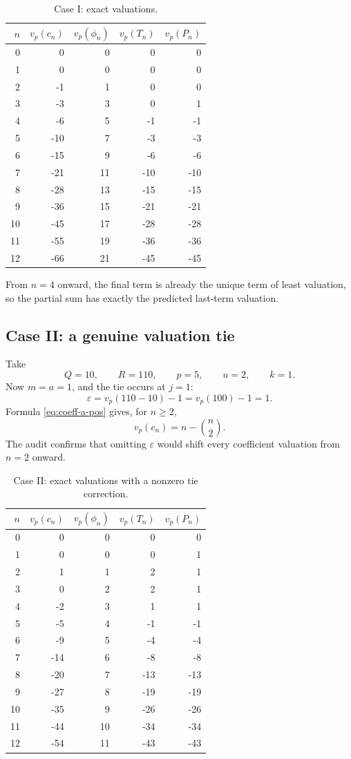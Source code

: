 \documentclass[11pt,oneside]{article}
\theoremstyle{definition}
\newcommand{\vp}{v_p}
\begin{document}
\begin{table}[H]
\centering
\caption{Case I: exact valuations.}
\label{tab:case1}
\begin{tabular}{r@{\qquad}r@{\qquad}r@{\qquad}r@{\qquad}r}
\toprule
$n$ & $\vp(c_n)$ & $\vp(\phi_n)$ & $\vp(T_n)$ & $\vp(P_n)$\\
\midrule
0&0&0&0&0\\
1&0&0&0&0\\
2&-1&1&0&0\\
3&-3&3&0&1\\
4&-6&5&-1&-1\\
5&-10&7&-3&-3\\
6&-15&9&-6&-6\\
7&-21&11&-10&-10\\
8&-28&13&-15&-15\\
9&-36&15&-21&-21\\
10&-45&17&-28&-28\\
11&-55&19&-36&-36\\
12&-66&21&-45&-45\\
\bottomrule
\end{tabular}
\end{table}

From $n=4$ onward, the final term is already the unique term of least valuation, so the
partial sum has exactly the predicted last-term valuation.

\subsection{Case II: a genuine valuation tie}

Take
\[
 Q=10,\qquad R=110,\qquad p=5,\qquad u=2,\qquad k=1.
\]
Now $m=a=1$, and the tie occurs at $j=1$:
\[
 \varepsilon=\vp(110-10)-1=\vp(100)-1=1.
\]
Formula \eqref{eq:coeff-a-pos} gives, for $n\ge2$,
\[
 \vp(c_n)=n-\binom n2.
\]
The audit confirms that omitting $\varepsilon$ would shift every coefficient valuation from
$n=2$ onward.

\begin{table}[H]
\centering
\caption{Case II: exact valuations with a nonzero tie correction.}
\label{tab:case2}
\begin{tabular}{r@{\qquad}r@{\qquad}r@{\qquad}r@{\qquad}r}
\toprule
$n$ & $\vp(c_n)$ & $\vp(\phi_n)$ & $\vp(T_n)$ & $\vp(P_n)$\\
\midrule
0&0&0&0&0\\
1&0&0&0&1\\
2&1&1&2&1\\
3&0&2&2&1\\
4&-2&3&1&1\\
5&-5&4&-1&-1\\
6&-9&5&-4&-4\\
7&-14&6&-8&-8\\
8&-20&7&-13&-13\\
9&-27&8&-19&-19\\
10&-35&9&-26&-26\\
11&-44&10&-34&-34\\
12&-54&11&-43&-43\\
\bottomrule
\end{tabular}
\end{table}
\end{document}
